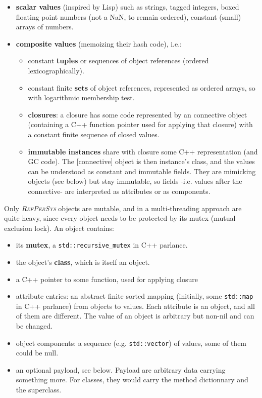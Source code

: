 \documentclass{IEEEtran}
\newcommand{\RefPerSys}{{\textit{\textsc{RefPerSys}}}}
\begin{document}
\begin{itemize}
\item \textbf{scalar values} (inspired by Lisp) such as strings,
  tagged integers, boxed floating point numbers (not a NaN, to remain
  ordered), constant (small) arrays of numbers.
\item \textbf{composite values} (memoizing their hash code), i.e.:
  \begin{itemize}
  \item constant \textbf{tuples} or sequences of object references (ordered
    lexicographically).
  \item constant finite \textbf{sets} of object references, represented as
    ordered arrays, so with logarithmic membership test.
  \item \textbf{closures}: a closure has some code represented by an
    connective object (containing a C++ function pointer used for
    applying that closure) with a constant finite sequence of closed
    values.
  \item \textbf{immutable instances} share with closure some C++
    representation (and GC code). The [connective] object is then
    instance's class, and the values can be understood as constant and
    immutable fields. They are mimicking objects (see below) but stay
    immutable, so fields -i.e. values after the connective- are
    interpreted as attributes or as components.
  \end{itemize}
\end{itemize}

Only {\RefPerSys} objects are mutable, and in a multi-threading
approach are quite heavy, since every object needs to be protected by
its mutex (mutual exclusion lock). An object contains:


\begin{itemize}
\item its \textbf{mutex}, a \texttt{std::recursive\_mutex} in C++ parlance.
\item the object's \textbf{class}, which is itself an object.
\item a C++ pointer to some function, used for applying closure
  \item attribute entries: an abstract finite sorted mapping
    (initially, some \texttt{std::map} in C++ parlance) from objects
    to values. Each attribute is an object, and all of them are
    different. The value of an object is arbitrary but non-nil and can
    be changed.
  \item object components: a sequence (e.g. \texttt{std::vector}) of
      values, some of them could be null.
    \item an optional payload, see below. Payload are arbitrary data
      carrying something more. For classes, they would carry the
      method dictionnary and the superclass.
\end{itemize}
\end{document}
